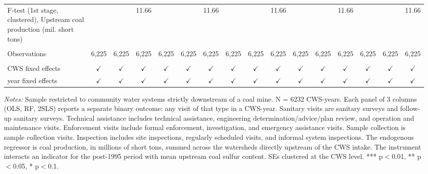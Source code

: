 \begin{table}[htbp]
\begin{adjustbox}{width = \textwidth, center}
\begin{tabular}{lccccccccccccccc}
         F-test (1st stage, clustered), Upstream coal production (mil. short tons) &               &                 & 11.66         &               &               & 11.66         &               &                & 11.66         &               &               & 11.66         &               &               & 11.66\\  
         
          \\
         
         Observations                                                              & 6,225         & 6,225           & 6,225         & 6,225         & 6,225         & 6,225         & 6,225         & 6,225          & 6,225         & 6,225         & 6,225         & 6,225         & 6,225         & 6,225         & 6,225\\  
         
          \\
         
         CWS fixed effects                                                         & $\checkmark$  & $\checkmark$    & $\checkmark$  & $\checkmark$  & $\checkmark$  & $\checkmark$  & $\checkmark$  & $\checkmark$   & $\checkmark$  & $\checkmark$  & $\checkmark$  & $\checkmark$  & $\checkmark$  & $\checkmark$  & $\checkmark$\\   
         year fixed effects                                                        & $\checkmark$  & $\checkmark$    & $\checkmark$  & $\checkmark$  & $\checkmark$  & $\checkmark$  & $\checkmark$  & $\checkmark$   & $\checkmark$  & $\checkmark$  & $\checkmark$  & $\checkmark$  & $\checkmark$  & $\checkmark$  & $\checkmark$\\   
         
         \bottomrule
         
      \end{tabular}
      
      
      
   \end{adjustbox}
      {\tiny\linespread{1}\selectfont \par \raggedright 
   \textit{Notes:} Sample restricted to community water systems strictly downstream of a coal mine. N = 6232 CWS-years. Each panel of 3 columns (OLS, RF, 2SLS) reports a separate binary outcome: any visit of that type in a CWS-year. Sanitary visits are sanitary surveys and follow-up sanitary surveys. Technical assistance includes technical assistance, engineering determination/advice/plan review, and operation and maintenance visits. Enforcement visits include formal enforcement, investigation, and emergency assistance visits. Sample collection is sample collection visits. Inspection includes site inspections, regularly scheduled visits, and informal system inspections. The endogenous regressor is coal production, in millions of short tons, summed across the watersheds directly upstream of the CWS intake. The instrument interacts an indicator for the post-1995 period with mean upstream coal sulfur content. SEs clustered at the CWS level. *** p$<$0.01, ** p$<$0.05, * p$<$0.1.}
   
\end{table}



